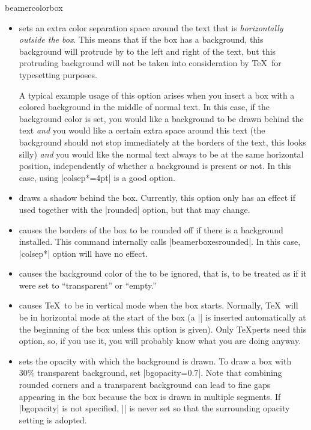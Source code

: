 \begin{environment}{{beamercolorbox}}
\begin{itemize}
  \item
     sets an extra color separation space around the text that is \emph{horizontally outside the box}. This means that if the box has a background, this background will protrude by  to the left and right of the text, but this protruding background will not be taken into consideration by \TeX\ for typesetting purposes.

    A typical example usage of this option arises when you insert a box with a colored background in the middle of normal text. In this case, if the background color is set, you would like a background to be drawn behind the text \emph{and} you would like a certain extra space around this text (the background should not stop immediately at the borders of the text, this looks silly) \emph{and} you would like the normal text always to be at the same horizontal position, independently of whether a background is present or not. In this case, using |colsep*=4pt| is a good option.
  \item
     draws a shadow behind the box. Currently, this option only has an effect if used together with the |rounded| option, but that may change.
  \item
     causes the borders of the box to be rounded off if there is a background installed. This command internally calls |beamerboxesrounded|. In this case, |colsep*| option will have no effect.
  \item
     causes the background color of the  to be ignored, that is, to be treated as if it were set to ``transparent'' or ``empty.''
  \item
     causes \TeX\ to be in vertical mode when the box starts. Normally, \TeX\ will be in horizontal mode at the start of the box (a |\leavevmode| is inserted automatically at the beginning of the box unless this option is given). Only \TeX perts need this option, so, if you use it, you will probably know what you are doing anyway.
  \item
     sets the opacity with which the background is drawn. To draw a box with 30\% transparent background, set |bgopacity=0.7|. Note that combining rounded corners and a transparent background can lead to fine gaps appearing in the box because the box is drawn in multiple segments. If |bgopacity| is not specified, |\pgfsetfillopacity| is never set so that the surrounding opacity setting is adopted.
  \end{itemize}
\end{environment}


